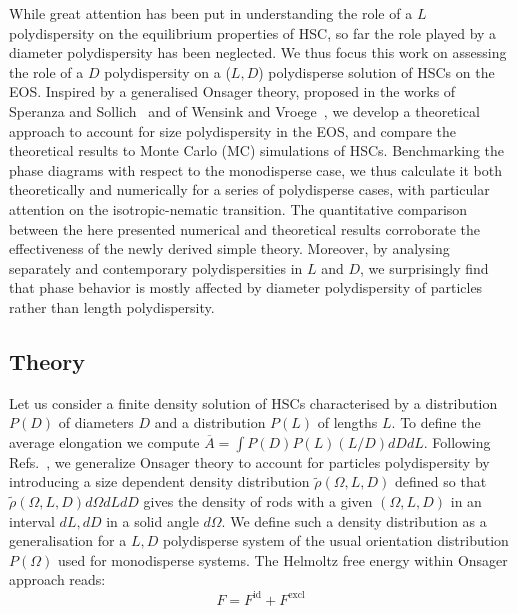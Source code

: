 \documentclass[journal=jacsat,manuscript=article]{achemso}
\begin{document}
While great attention has been put in understanding the role of a $L$ polydispersity on the equilibrium properties of HSC, so far the  role played by  a diameter polydispersity has been neglected. We thus focus this work on assessing the role of a $D$ polydispersity on a ($L,D$) polydisperse solution of HSCs on the EOS.
Inspired by a generalised Onsager theory, proposed in the works of Speranza and Sollich~\cite{Speranza2002}
and of Wensink and Vroege~\cite{Wensink2003}, we develop a theoretical approach to account for size polydispersity in the EOS, and compare the theoretical results to Monte Carlo  (MC) simulations of HSCs. 
Benchmarking the phase diagrams with respect to the monodisperse case, we thus calculate it both theoretically and numerically for a series of polydisperse cases, with particular attention on the  isotropic-nematic transition.
The quantitative comparison between the here presented numerical and theoretical results corroborate the effectiveness of the newly derived simple theory.
Moreover, by analysing separately and contemporary polydispersities in $L$ and $D$, we surprisingly find that phase behavior is mostly affected by diameter polydispersity of particles rather than length polydispersity. 


\subsection{Theory} \label{sec:Theory}
Let us consider a finite density solution of HSCs  characterised by a distribution $P(D)$ of diameters $D$ and a distribution $P(L)$ of lengths $L$.  To define the average elongation we compute $\overline{A}= \int P(D) P(L) (L/D) dD dL$.
Following Refs.~\cite{Speranza2002,Wensink2003}, we generalize Onsager theory to account for particles polydispersity by introducing a 
size dependent density distribution $\tilde{\rho}(\Omega,L,D)$ defined so that $\tilde{\rho}(\Omega,L,D)d\Omega dL dD $ gives the density of rods with a given $(\Omega,L,D)$ in an interval $dL, dD$ in a solid angle  $d\Omega$. We define such a density distribution as a generalisation for a $L,D$ polydisperse system of the usual orientation distribution $P(\Omega)$ used for monodisperse systems.
The Helmoltz free energy within Onsager approach reads:
\begin{equation}
	F = F^\mathrm{id} + F^\mathrm{excl}
\end{equation}
\end{document}
